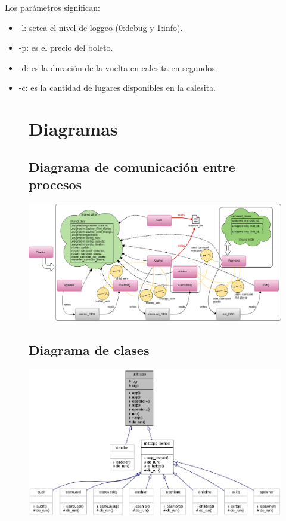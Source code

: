 \documentclass[a4paper,10pt]{article}
\begin{document}
Los parámetros significan:

	\begin{itemize}
    \item -l: setea el nivel de loggeo (0:debug y 1:info).
	\item -p: es el precio del boleto.
    \item -d: es la duración de la vuelta en calesita en segundos.
    \item -c: es la cantidad de lugares disponibles en la calesita.
   	\end{itemize}

\clearpage
\begin{figure}
    \section{Diagramas}
	\subsection{Diagrama de comunicación entre procesos}

	\begin{center}
        \includegraphics[scale=0.52,angle=90]{general_idea.png}
    \end{center}
 \end{figure}

\clearpage

\begin{figure}
	\subsection{Diagrama de clases}

	\begin{center}
        \includegraphics[scale=0.7,angle=90]{class_app.png}
    \end{center}
 \end{figure}
\end{document}
